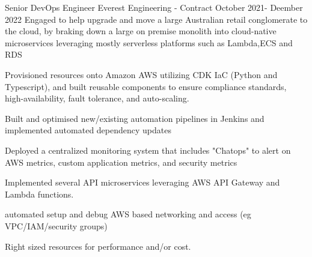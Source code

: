 \begin{cventries}
  \cventryextended
  {Senior DevOps Engineer} %
  {Everest Engineering - Contract} %
  {} %
  {October 2021- Deember 2022} %
  {Engaged to help upgrade and move a large Australian retail conglomerate to
    the cloud, by braking down a large on premise monolith into cloud-native
    microservices leveraging mostly serverless platforms such as Lambda,ECS and
    RDS}
  {
    \begin{cvitems} %
      \item {Provisioned resources onto Amazon AWS utilizing CDK IaC (Python
                  and Typescript), and built reusable components to ensure
                  compliance standards,
                  high-availability, fault tolerance, and auto-scaling.}
      \item {Built and optimised new/existing automation pipelines in Jenkins
                  and implemented automated dependency updates}
      \item {Deployed a centralized monitoring system that includes "Chatops"
                  to alert on AWS metrics, custom application metrics, and
                  security metrics }
      \item {Implemented several API microservices leveraging AWS API Gateway
                  and Lambda functions.}
      \item {automated setup and debug AWS based networking and access (eg
                  VPC/IAM/security groups)}
      \item {Right sized resources for performance and/or cost.}
    \end{cvitems}
  }


\end{cventries}
